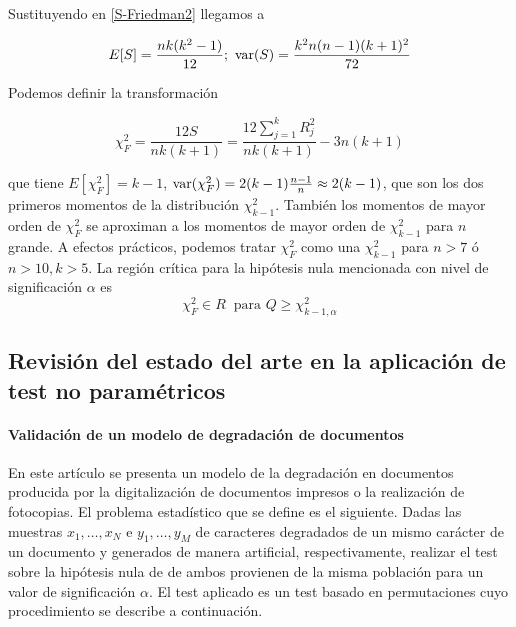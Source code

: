 	Sustituyendo en \ref{S-Friedman2} llegamos a 
	
	\[ E[S] = \frac{nk(k^2-1)}{12}; \ 
		\var(S)= \frac{k^2n(n-1)(k+1)^2}{72} \]
	
	Podemos definir la transformación
	
	\[ \chi^2_F = \frac{12S}{nk(k+1)} = 
	\frac{12 \sum\limits_{j=1}^k R_j^2}{nk(k+1)} -3n(k+1)\]
	
	que tiene $E[\chi^2_F] = k-1$, $\text{var}(\chi^2_F)= 2(k-1)\frac{n-1}{n} \approx 2(k-1)$, que son los dos primeros momentos de la distribución $\chi^2_{k-1}$. También los momentos de mayor orden de $\chi^2_F$ se aproximan a los momentos de mayor orden de $\chi^2_{k-1}$ para $n$ grande. A efectos prácticos, podemos tratar $\chi^2_F$ como una $\chi^2_{k-1}$ para $n>7$ ó $n>10, k>5$. La región crítica para la hipótesis nula mencionada con nivel de significación $\alpha$ es
	\[ \chi^2_F \in R \ \text{ para } Q \geq \chi_{k-1,\alpha}^2 \]
	
	
\subsection{Revisión del estado del arte en la aplicación de test no paramétricos}
 
\paragraph{Validación de un modelo de degradación de documentos} \cite{KANUNGO00} En este artículo se presenta un modelo de la degradación en documentos producida por la digitalización de documentos impresos o la realización de fotocopias. El problema estadístico que se define es el siguiente. Dadas las muestras $x_1, \dots, x_N$ e $y_1, \dots, y_M$ de caracteres degradados de un mismo carácter de un documento y generados de manera artificial, respectivamente, realizar el test sobre la hipótesis nula de de ambos  provienen de la misma población para un valor de significación $\alpha$. El test aplicado es un test basado en permutaciones cuyo procedimiento se describe a continuación.

